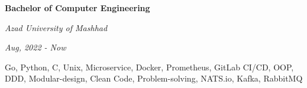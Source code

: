 \documentclass{engineercv}
\begin{document}
\begin{minipage}{\textwidth}
  \begin{multicols}{2}
    \begin{minipage}{0.5\textwidth}
      \textbf{Bachelor of Computer Engineering}

      \textit{Azad University of Mashhad}

      \textit{Aug, 2022 - Now}
    \end{minipage}
    \columnbreak
    \begin{minipage}{0.55\textwidth}
      Go, Python, C, Unix, Microservice, Docker, Prometheus, GitLab CI/CD, OOP, DDD,
      Modular-design, Clean Code, Problem-solving, NATS.io, Kafka, RabbitMQ
    \end{minipage}
  \end{multicols}
\end{minipage}
\end{document}
